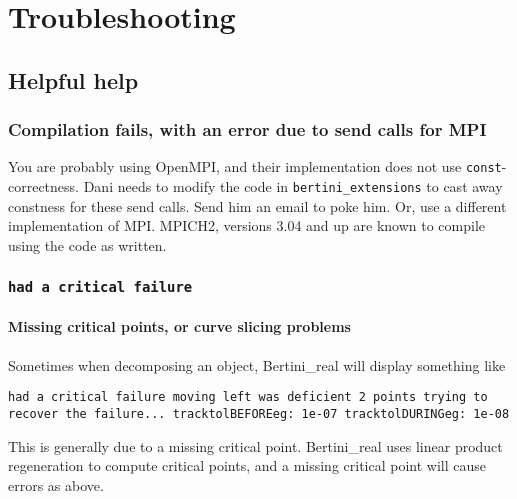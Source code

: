 
\section{Troubleshooting}

\subsection{Helpful help}

\subsubsection{Compilation fails, with an error due to send calls for MPI}

You are probably using OpenMPI, and their implementation does not use {\tt const}-correctness.  Dani needs to modify the code in {\tt bertini\_extensions} to cast away constness for these send calls.  Send him an email to poke him.  Or, use a different implementation of MPI.  MPICH2, versions 3.04 and up are known to compile using the code as written. 




\subsubsection{\tt had a critical failure}

\paragraph{Missing critical points, or curve slicing problems}

Sometimes when decomposing an object, Bertini\_real will display something like

{\tt	had a critical failure
 moving left was deficient 2 points
trying to recover the failure...
tracktolBEFOREeg: 1e-07 tracktolDURINGeg: 1e-08
}

This is generally due to a missing critical point.  Bertini\_real uses linear product regeneration to compute critical points, and a missing critical point will cause errors as above.  

